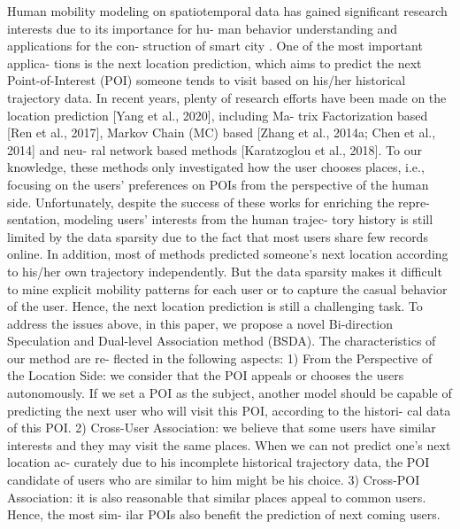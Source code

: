 \documentclass{article}
\begin{document}
Human mobility modeling on spatiotemporal data has gained
significant research interests due to its importance for hu-
man behavior understanding and applications for the con-
struction of smart city \cite{yu2019adaptive,wang2019beyond,wang2021very}. One of the most important applica-
tions is the next location prediction, which aims to predict
the next Point-of-Interest (POI) someone tends to visit based
on his/her historical trajectory data.
In recent years, plenty of research efforts have been made
on the location prediction [Yang et al., 2020], including Ma-
trix Factorization based [Ren et al., 2017], Markov Chain
(MC) based [Zhang et al., 2014a; Chen et al., 2014] and neu-
ral network based methods [Karatzoglou et al., 2018]. To
our knowledge, these methods only investigated how the user
chooses places, i.e., focusing on the users’ preferences on
POIs from the perspective of the human side. Unfortunately, despite the success of these works for enriching the repre-
sentation, modeling users’ interests from the human trajec-
tory history is still limited by the data sparsity due to the fact
that most users share few records online. In addition, most
of methods predicted someone’s next location according to
his/her own trajectory independently. But the data sparsity
makes it difficult to mine explicit mobility patterns for each
user or to capture the casual behavior of the user. Hence, the
next location prediction is still a challenging task.
To address the issues above, in this paper, we propose a
novel Bi-direction Speculation and Dual-level Association
method (BSDA). The characteristics of our method are re-
flected in the following aspects: 1) From the Perspective
of the Location Side: we consider that the POI appeals or
chooses the users autonomously. If we set a POI as the
subject, another model should be capable of predicting the
next user who will visit this POI, according to the histori-
cal data of this POI. 2) Cross-User Association: we believe
that some users have similar interests and they may visit the
same places. When we can not predict one’s next location ac-
curately due to his incomplete historical trajectory data, the
POI candidate of users who are similar to him might be his
choice. 3) Cross-POI Association: it is also reasonable that
similar places appeal to common users. Hence, the most sim-
ilar POIs also benefit the prediction of next coming users.
\end{document}
